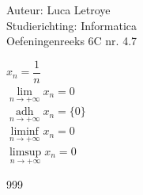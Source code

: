 \documentclass[a4paper]{article}
\begin{document}
  
\noindent \large Auteur: Luca Letroye \\
\noindent \large Studierichting: Informatica\\
\noindent \large Oefeningenreeks 6C nr. 4.7

\medskip
\normalsize

$x_n = \dfrac{1}{n}$\\

$\lim\limits_{n \rightarrow +\infty} x_n = 0$\\

$\operatorname*{adh}\limits_{n \rightarrow +\infty} x_n = \{0\}$\\

$\liminf\limits_{n \rightarrow +\infty} x_n = 0$\\

$\limsup\limits_{n \rightarrow +\infty} x_n = 0$\\






\begin{thebibliography}{999}
\end{thebibliography}
\end{document}
